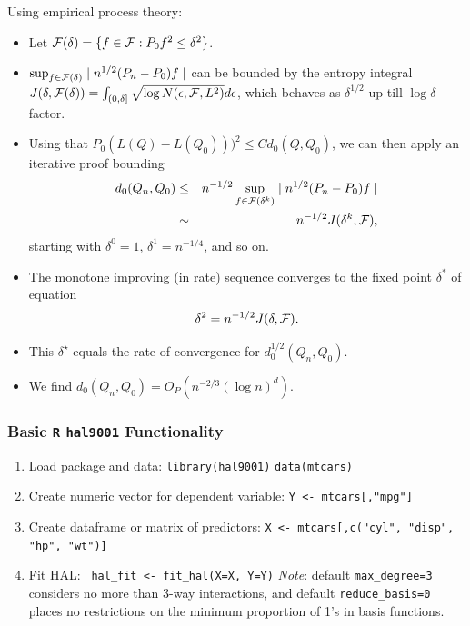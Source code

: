 \documentclass[t]{beamer}
\begin{document}
\begin{frame}{Using empirical process theory:}
\begin{itemize}
\item Let ${\cal F}(\delta)=\{f\in {\cal F}: P_0f^2\leq \delta^2\}$.
\item $\sup_{f\in {\cal F}(\delta)}\mid n^{1/2}(P_n-P_0)f\mid$ can be bounded by  the entropy integral
$J(\delta,{\cal F}(\delta))=\int_{(0,\delta]}\sqrt{\log N(\epsilon,{\cal F},L^2)} d\epsilon$, which behaves as $\delta^{1/2}$ up till $\log \delta$-factor.
\item Using that $P_0(L(Q)-L(Q_0)))^2\leq C d_0(Q,Q_0)$, we can then apply an iterative proof bounding
\begin{eqnarray}
d_0(Q_n,Q_0)&\leq& n^{-1/2}\sup_{f\in {\cal F}(\delta^k)}\mid n^{1/2}(P_n-P_0)f\mid\\
&\sim & n^{-1/2} J(\delta^k,{\cal F}),
\end{eqnarray}
 starting with $\delta^0=1$, $\delta^1=n^{-1/4}$, and so on.
  \end{itemize}
 \end{frame}
 \begin{frame}
 \begin{itemize}
 \item The monotone improving (in rate) sequence converges to the fixed point $\delta^*$ of equation
 \[
 \delta^2=n^{-1/2}J(\delta,{\cal F}).\]
 \item
This $\delta^{\star}$ equals the rate of convergence for $d_0^{1/2}(Q_n,Q_0)$.
\item We find $d_0(Q_n,Q_0)=O_P(n^{-2/3}(\log n)^d)$.
\end{itemize}
\end{frame}

\begin{frame}
\frametitle{Basic \texttt{R} \texttt{hal9001} Functionality}
\begin{enumerate}
    \item Load package and data: \newline \texttt{library(hal9001)} \newline
    \texttt{data(mtcars)}
    \item Create numeric vector for dependent variable: \newline \texttt{Y <-  mtcars[,"mpg"]}
    \item Create dataframe or matrix of predictors: \newline
    \texttt{X <- mtcars[,c("cyl", "disp", "hp", "wt")]}
    \item Fit HAL: \newline
   \texttt{ hal\_fit <- fit\_hal(X=X, Y=Y)}\newline
   \newline
   \small{\textit{Note}: default \texttt{max\_degree=3} considers no more than 3-way interactions, and default \texttt{reduce\_basis=0} places no restrictions on the minimum proportion of 1's in basis functions.}
\end{enumerate}
\end{frame}
\end{document}

